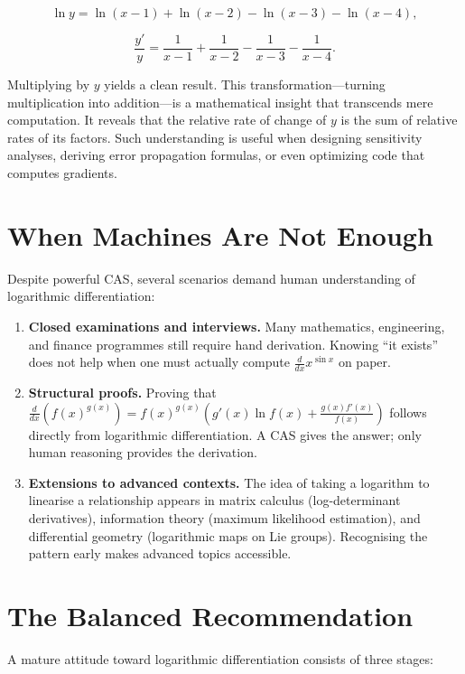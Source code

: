 \documentclass[12pt]{article}
\begin{document}
\[
\ln y = \ln(x-1)+\ln(x-2)-\ln(x-3)-\ln(x-4),
\]

\[
\frac{y'}{y} = \frac{1}{x-1}+\frac{1}{x-2}-\frac{1}{x-3}-\frac{1}{x-4}.
\]

Multiplying by \(y\) yields a clean result. This transformation—turning multiplication into addition—is a mathematical insight that transcends mere computation. It reveals that the relative rate of change of \(y\) is the sum of relative rates of its factors. Such understanding is useful when designing sensitivity analyses, deriving error propagation formulas, or even optimizing code that computes gradients.

\section*{When Machines Are Not Enough}

Despite powerful CAS, several scenarios demand human understanding of logarithmic differentiation:

\begin{enumerate}
\item \textbf{Closed examinations and interviews.} Many mathematics, engineering, and finance programmes still require hand derivation. Knowing ``it exists'' does not help when one must actually compute \( \frac{d}{dx} x^{\sin x} \) on paper.
\item \textbf{Structural proofs.} Proving that \( \frac{d}{dx} \left( f(x)^{g(x)} \right) = f(x)^{g(x)} \left( g'(x)\ln f(x) + \frac{g(x)f'(x)}{f(x)} \right) \) follows directly from logarithmic differentiation. A CAS gives the answer; only human reasoning provides the derivation.
\item \textbf{Extensions to advanced contexts.} The idea of taking a logarithm to linearise a relationship appears in matrix calculus (log-determinant derivatives), information theory (maximum likelihood estimation), and differential geometry (logarithmic maps on Lie groups). Recognising the pattern early makes advanced topics accessible.
\end{enumerate}

\section*{The Balanced Recommendation}

A mature attitude toward logarithmic differentiation consists of three stages:
\end{document}
